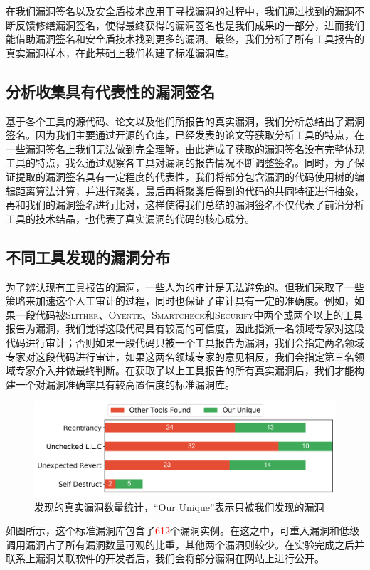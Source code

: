 在我们漏洞签名以及安全盾技术应用于寻找漏洞的过程中，我们通过找到的漏洞不断反馈修缮漏洞签名，使得最终获得的漏洞签名也是我们成果的一部分，进而我们能借助漏洞签名和安全盾技术找到更多的漏洞。最终，我们分析了所有工具报告的真实漏洞样本，在此基础上我们构建了标准漏洞库。

\subsection{分析收集具有代表性的漏洞签名}

基于各个工具的源代码、论文以及他们所报告的真实漏洞，我们分析总结出了漏洞签名。因为我们主要通过开源的仓库，已经发表的论文等获取分析工具的特点，在一些漏洞签名上我们无法做到完全理解，由此造成了获取的漏洞签名没有完整体现工具的特点，我么通过观察各工具对漏洞的报告情况不断调整签名。同时，为了保证提取的漏洞签名具有一定程度的代表性，我们将部分包含漏洞的代码使用树的编辑距离算法\cite{treeEditDistance}计算，并进行聚类，最后再将聚类后得到的代码的共同特征进行抽象，再和我们的漏洞签名进行比对，这样使得我们总结的漏洞签名不仅代表了前沿分析工具的技术结晶，也代表了真实漏洞的代码的核心成分。

\subsection{不同工具发现的漏洞分布}

为了辨认现有工具报告的漏洞，一些人为的审计是无法避免的。但我们采取了一些策略来加速这个人工审计的过程，同时也保证了审计具有一定的准确度。例如，如果一段代码被\textsc{Slither}、\textsc{Oyente}、\textsc{Smartcheck}和\textsc{Securify}中两个或两个以上的工具报告为漏洞，我们觉得这段代码具有较高的可信度，因此指派一名领域专家对这段代码进行审计；否则如果一段代码只被一个工具报告为漏洞，我们会指定两名领域专家对这段代码进行审计，如果这两名领域专家的意见相反，我们会指定第三名领域专家介入并做最终判断。在获取了以上工具报告的所有真实漏洞后，我们才能构建一个对漏洞准确率具有较高置信度的标准漏洞库。
\begin{figure}
  \centering
  \includegraphics[width=\linewidth]{figures/unique_tp.png}
  \caption{发现的真实漏洞数量统计，“Our Unique”表示只被我们发现的漏洞}\label{fig:unique_tp}
\end{figure}
如图所示，这个标准漏洞库包含了\textcolor{red}{612}个漏洞实例。在这之中，可重入漏洞和低级调用漏洞占了所有漏洞数量可观的比重，其他两个漏洞则较少。在实验完成之后并联系上漏洞关联软件的开发者后，我们会将部分漏洞在网站上进行公开。

